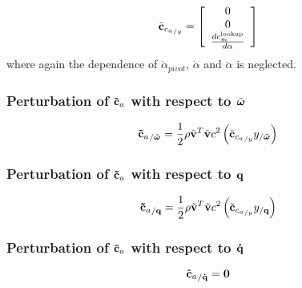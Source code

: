 \begin{equation}
\tilde{\bm{\mathbf{c}}}_{{c_{a}}_{/y}} = \left[
	\begin{array}{cccc}
		0\\
		0\\
		\frac{ d c_m^{\text{lookup}}}{d \alpha} 
	\end{array} \right]
\end{equation}
where again the dependence of $\dot{\alpha}_{pivot}$, $\dot{\alpha}$ and $\ddot{\alpha}$ is 
neglected.
\subsubsection{Perturbation of $\bm{\mathbf{\tilde{c}}}_a$ with respect to $\tilde{\bm{\mathbf{\omega}}}$}
\begin{equation}
{\bm{\mathbf{\tilde{c}}}_a}_{/\tilde{\bm{\mathbf{\omega}}}} = 
	\frac{1}{2} \rho \tilde{\bm{\mathbf{v}}}^T \tilde{\bm{\mathbf{v}}} c^2
	\left(  \tilde{\bm{\mathbf{c}}}_{{c_{a}}_{/y}} y_{/\tilde{\bm{\mathbf{\omega}}}}  \right) 
\end{equation}
\subsubsection{Perturbation of $\bm{\mathbf{\tilde{c}}}_a$ with respect to $\bm{\mathbf{q}}$}
\begin{equation}
{\bm{\mathbf{\tilde{c}}}_a}_{/\bm{\mathbf{q}}} = 
	\frac{1}{2} \rho \tilde{\bm{\mathbf{v}}}^T \tilde{\bm{\mathbf{v}}} c^2
	\left(  \tilde{\bm{\mathbf{c}}}_{{c_{a}}_{/y}} y_{/\bm{\mathbf{q}}}  \right) 
\end{equation}
\subsubsection{Perturbation of $\bm{\mathbf{\tilde{c}}}_a$ with respect to $\bm{\mathbf{\dot{q}}}$}
\begin{equation}
{\bm{\mathbf{\tilde{c}}}_a}_{/\bm{\mathbf{\dot{q}}}} = \bm{\mathbf{0}}
\end{equation}

